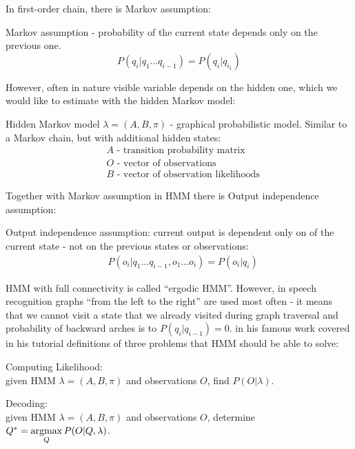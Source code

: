 In first-order chain, there is Markov assumption:
\begin{definition} Markov assumption - probability of the current state depends only on the previous one.
	\begin{equation}
		P(q_i|q_1\ldots q_{i-1})=P(q_i|q_{i_1})
	\end{equation}
\end{definition}
However, often in nature visible variable depends on the hidden one, which we would like to estimate with the hidden Markov model:

\begin{definition} Hidden Markov model $\lambda=(A,B,\pi)$ - graphical probabilistic model. Similar to a Markov chain, but with additional hidden states:
	\begin{align}
		&A \text{ - transition probability matrix } \\
		&O \text{ - vector of observations} \\
		&B \text{ - vector of observation likelihoods}
	\end{align}
\end{definition}
Together with Markov assumption in HMM there is Output independence assumption: 

\begin{definition} Output independence assumption: current output is dependent only on of the current state - not on the previous states or observations: 
	\begin{align}
		& P(o_i|q_1 \ldots q_{i-1},o_1 \ldots o_i)=P(o_i|q_i)
	\end{align}
\end{definition} 
HMM with full connectivity is called ``ergodic HMM''. However, in speech recognition graphs ``from the left to the right'' are used most often - it means that we cannot visit a state that we already visited during graph traversal and probability of backward arches is to $P(q_i|q_{i-1})=0$. \textcite{rabiner_tutorial_1989} in his famous work covered in his tutorial definitions of three problems that HMM should be able to solve:


\begin{definition} Computing Likelihood: \\
	\label{def:comp_likelihood}
	given HMM $\lambda = (A,B,\pi)$ and observations $O$, find $P(O|\lambda)$.	
\end{definition}

\begin{definition} Decoding: \\
	\label{def:hmm_decoding}
	given HMM $\lambda = (A,B,\pi)$ and observations $O$, determine $Q^*=\operatorname*{argmax}\limits_Q P(O|Q,\lambda)$.	
\end{definition}

